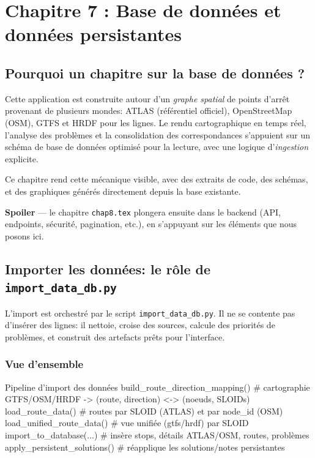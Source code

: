 \chapter{Chapitre 7 : Base de données et données persistantes}

\section*{Pourquoi un chapitre sur la base de données ?}

Cette application est construite autour d'un \textit{graphe spatial} de points d'arrêt provenant de plusieurs mondes: ATLAS (référentiel officiel), OpenStreetMap (OSM), GTFS et HRDF pour les lignes. Le rendu cartographique en temps réel, l'analyse des problèmes et la consolidation des correspondances s'appuient sur un schéma de base de données optimisé pour la lecture, avec une logique d'\textit{ingestion} explicite. 

Ce chapitre rend cette mécanique visible, avec des extraits de code, des schémas, et des graphiques générés directement depuis la base existante.

\vspace{0.5em}
\textbf{Spoiler} — le chapitre \texttt{chap8.tex} plongera ensuite dans le backend (API, endpoints, sécurité, pagination, etc.), en s'appuyant sur les éléments que nous posons ici.

\section{Importer les données: le rôle de \texttt{import\_data\_db.py}}
L'import est orchestré par le script \texttt{import\_data\_db.py}. Il ne se contente pas d'insérer des lignes: il nettoie, croise des sources, calcule des priorités de problèmes, et construit des artefacts prêts pour l'interface.

\subsection*{Vue d'ensemble}
\begin{codebox}[language=Python]{Pipeline d'import des données}
build_route_direction_mapping()  # cartographie GTFS/OSM/HRDF -> (route, direction) <-> (noeuds, SLOIDs)
load_route_data()                # routes par SLOID (ATLAS) et par node_id (OSM)
load_unified_route_data()        # vue unifiée (gtfs/hrdf) par SLOID
import_to_database(...)          # insère stops, détails ATLAS/OSM, routes, problèmes
apply_persistent_solutions()     # réapplique les solutions/notes persistantes
\end{codebox}

